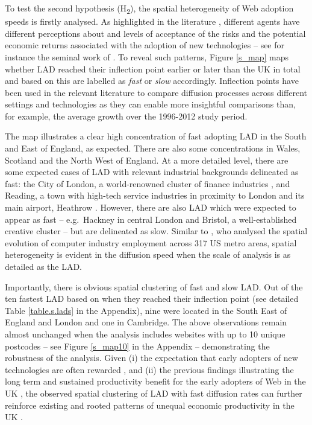 \documentclass[
  authoryear,
  preprint,
  3p]{elsarticle}
\begin{document}
To test the second hypothesis (H\textsubscript{2}), the spatial
heterogeneity of Web adoption speeds is firstly analysed. As highlighted
in the literature \citep{risk_perceptions}, different agents have
different perceptions about and levels of acceptance of the risks and
the potential economic returns associated with the adoption of new
technologies -- see for instance the seminal work of
\citet{venkatesh2000theoretical}. To reveal such patterns, Figure
\ref{s_map} maps whether LAD reached their inflection point earlier or
later than the UK in total and based on this are labelled as \emph{fast}
or \emph{slow} accordingly. Inflection points have been used in the
relevant literature to compare diffusion processes across different
settings and technologies \citep{cherp2021national, woo2017exploring} as
they can enable more insightful comparisons than, for example, the
average growth over the 1996-2012 study period.

The map illustrates a clear high concentration of fast adopting LAD in
the South and East of England, as expected. There are also some
concentrations in Wales, Scotland and the North West of England. At a
more detailed level, there are some expected cases of LAD with relevant
industrial backgrounds delineated as fast: the City of London, a
world-renowned cluster of finance industries \citep{cook2007role}, and
Reading, a town with high-tech service industries in proximity to London
and its main airport, Heathrow \citep{england2005polynet}. However,
there are also LAD which were expected to appear as fast -- e.g.~Hackney
in central London and Bristol, a well-established creative cluster
\citep{oatley1999cultural, bassett2002cultural} -- but are delineated as
slow. Similar to \citet{beardsell1999spatial}, who analysed the spatial
evolution of computer industry employment across 317 US metro areas,
spatial heterogeneity is evident in the diffusion speed when the scale
of analysis is as detailed as the LAD.

Importantly, there is obvious spatial clustering of fast and slow LAD.
Out of the ten fastest LAD based on when they reached their inflection
point (see detailed Table \ref{table.s.lads} in the Appendix), nine were
located in the South East of England and London and one in Cambridge.
The above observations remain almost unchanged when the analysis
includes websites with up to 10 unique postcodes -- see Figure
\ref{s_map10} in the Appendix -- demonstrating the robustness of the
analysis. Given (i) the expectation that early adopters of new
technologies are often rewarded
\citep{rogers2010diffusion, griliches1957, ding2010modeling}, and (ii)
the previous findings illustrating the long term and sustained
productivity benefit for the early adopters of Web in the UK
\citep{tranosuk}, the observed spatial clustering of LAD with fast
diffusion rates can further reinforce existing and rooted patterns of
unequal economic productivity in the UK \citep{mccann2022productivity}.
\end{document}
